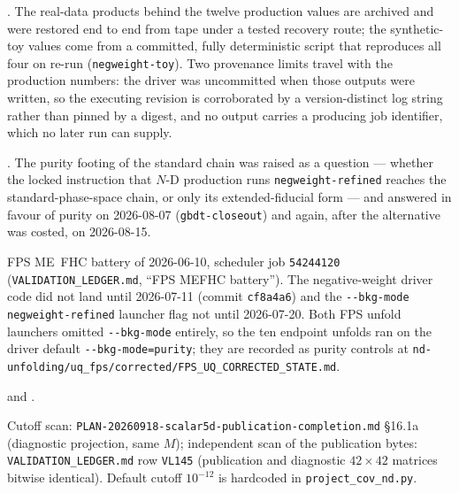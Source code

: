 \begin{description}[leftmargin=0pt,itemsep=3pt]
  \item[\texttt{negweight-hpss}.] . The real-data products behind the twelve production values are archived and were restored end to end from tape under a tested recovery route; the synthetic-toy values come from a committed, fully deterministic script that reproduces all four on re-run (\texttt{negweight-toy}). Two provenance limits travel with the production numbers: the driver was uncommitted when those outputs were written, so the executing revision is corroborated by a version-distinct log string rather than pinned by a digest, and no output carries a producing job identifier, which no later run can supply.
  \item[\texttt{oi6-oi8-oi126}.] . The purity footing of the standard chain was raised as a question --- whether the locked instruction that $N$-D production runs \texttt{negweight-refined} reaches the standard-phase-space chain, or only its extended-fiducial form --- and answered in favour of purity on 2026-08-07 (\texttt{gbdt-closeout}) and again, after the alternative was costed, on 2026-08-15.
  \item[\texttt{fps-battery}.] FPS ME~FHC battery of 2026-06-10, scheduler job \texttt{54244120} (\texttt{VALIDATION\_LEDGER.md}, ``FPS MEFHC battery''). The negative-weight driver code did not land until 2026-07-11 (commit \texttt{cf8a4a6}) and the \texttt{-{}-bkg-mode negweight-refined} launcher flag not until 2026-07-20. Both FPS unfold launchers omitted \texttt{-{}-bkg-mode} entirely, so the ten endpoint unfolds ran on the driver default \texttt{-{}-bkg-mode=purity}; they are recorded as purity controls at \texttt{nd-unfolding/uq\_fps/corrected/}\allowbreak\texttt{FPS\_UQ\_CORRECTED\_STATE.md}.
  \item[\texttt{z-projection}.]  and .
  \item[\texttt{z-conditioning}.] Cutoff scan: \texttt{PLAN-20260918-scalar5d-publication-completion.md} \S16.1a (diagnostic projection, same $M$); independent scan of the publication bytes: \texttt{VALIDATION\_LEDGER.md} row \texttt{VL145} (publication and diagnostic $42\times42$ matrices bitwise identical). Default cutoff $10^{-12}$ is hardcoded in \texttt{project\_cov\_nd.py}.
\end{description}

